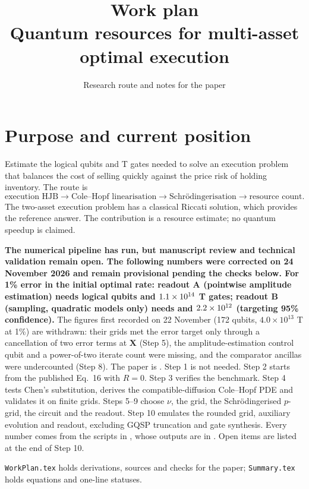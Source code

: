 \documentclass[11pt,a4paper]{article}
\title{\textbf{Work plan}\\\large Quantum resources for multi-asset optimal execution}
\author{Research route and notes for the paper}
\date{}
\begin{document}
\maketitle

\section*{Purpose and current position}

Estimate the logical qubits and T gates needed to solve an execution
problem that balances the cost of selling quickly against the price risk
of holding inventory. The route is
\[
 \text{execution HJB}\longrightarrow\text{Cole--Hopf linearisation}
 \longrightarrow\text{Schr\"odingerisation}\longrightarrow\text{resource count}.
\]
The two-asset execution problem has a classical Riccati solution, which
provides the reference answer. The contribution is a resource estimate;
no quantum speedup is claimed.

\textbf{The numerical pipeline has run, but manuscript review and technical
validation remain open. The following numbers were corrected on 24 November 2026
and remain provisional pending the checks below.
For 1\% error in the initial optimal rate: readout A (pointwise amplitude
estimation) needs \QAOne{} logical qubits and $1.1\times10^{14}$ T gates; readout B
(sampling, quadratic models only) needs \QBOne{} and $2.2\times10^{12}$ (targeting 95\%
confidence).} The figures first recorded on 22 November (172 qubits,
$4.0\times10^{13}$ T at 1\%) are withdrawn: their grids met the error target
only through a cancellation of two error terms at $\mathbf X$ (Step 5), the
amplitude-estimation control qubit and a power-of-two iterate count were
missing, and the comparator ancillas were undercounted (Step 8). The paper is
.
Step 1 is not needed. Step 2 starts from the published Eq.~16 with $R=0$.
Step 3 verifies the benchmark. Step 4 tests Chen's substitution, derives
the compatible-diffusion Cole--Hopf PDE and validates it on finite grids.
Steps 5--9 choose $\nu$, the grid, the Schr\"odingerised $p$-grid, the
circuit and the readout. Step 10 emulates the rounded grid, auxiliary evolution
and readout, excluding GQSP truncation and gate synthesis.
Every number comes from the scripts in , whose outputs
are in . Open items are listed at the end of
Step 10.

\texttt{WorkPlan.tex} holds derivations, sources and checks for the paper;
\texttt{Summary.tex} holds equations and one-line statuses.
\end{document}
